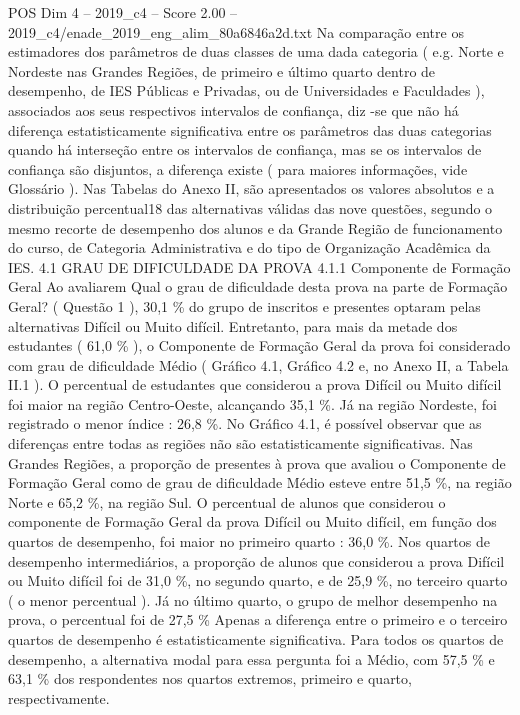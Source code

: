 \begin{textsample}{POS Dim 4 – 2019\_c4 – Score 2.00 – 2019\_c4/enade\_2019\_eng\_alim\_80a6846a2d.txt}
Na comparação entre os estimadores dos parâmetros de duas classes de uma dada categoria ( e.g.
Norte e Nordeste nas Grandes Regiões, de primeiro e último quarto dentro de desempenho, de IES Públicas e Privadas, ou de Universidades e Faculdades ), associados aos seus respectivos intervalos de confiança, diz -se que não há diferença estatisticamente significativa entre os parâmetros das duas categorias quando há interseção entre os intervalos de confiança, mas se os intervalos de confiança são disjuntos, a diferença existe ( para maiores informações, vide Glossário ).
Nas Tabelas do Anexo II, são apresentados os valores absolutos e a distribuição percentual18 das alternativas válidas das nove questões, segundo o mesmo recorte de desempenho dos alunos e da Grande Região de funcionamento do curso, de Categoria Administrativa e do tipo de Organização Acadêmica da IES. 4.1 GRAU DE DIFICULDADE DA PROVA 4.1.1 Componente de Formação Geral Ao avaliarem Qual o grau de dificuldade desta prova na parte de Formação Geral? ( Questão 1 ), 30,1 \% do grupo de inscritos e presentes optaram pelas alternativas Difícil ou Muito difícil.
Entretanto, para mais da metade dos estudantes ( 61,0 \% ), o Componente de Formação Geral da prova foi considerado com grau de dificuldade Médio ( Gráfico 4.1, Gráfico 4.2 e, no Anexo II, a Tabela II.1 ).
O percentual de estudantes que considerou a prova Difícil ou Muito difícil foi maior na região Centro-Oeste, alcançando 35,1 \%.
Já na região Nordeste, foi registrado o menor índice : 26,8 \%.
No Gráfico 4.1, é possível observar que as diferenças entre todas as regiões não são estatisticamente significativas.
Nas Grandes Regiões, a proporção de presentes à prova que avaliou o Componente de Formação Geral como de grau de dificuldade Médio esteve entre 51,5 \%, na região Norte e 65,2 \%, na região Sul.
O percentual de alunos que considerou o componente de Formação Geral da prova Difícil ou Muito difícil, em função dos quartos de desempenho, foi maior no primeiro quarto : 36,0 \%.
Nos quartos de desempenho intermediários, a proporção de alunos que considerou a prova Difícil ou Muito difícil foi de 31,0 \%, no segundo quarto, e de 25,9 \%, no terceiro quarto ( o menor percentual ).
Já no último quarto, o grupo de melhor desempenho na prova, o percentual foi de 27,5 \% Apenas a diferença entre o primeiro e o terceiro quartos de desempenho é estatisticamente significativa.
Para todos os quartos de desempenho, a alternativa modal para essa pergunta foi a Médio, com 57,5 \% e 63,1 \% dos respondentes nos quartos extremos, primeiro e quarto, respectivamente.

\end{textsample}
